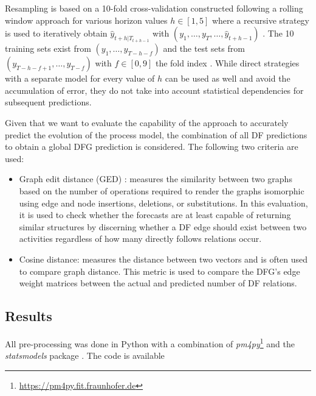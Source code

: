 Resampling is based on a 10-fold cross-validation constructed following a rolling window approach for various horizon values $h\in[1,5]$ where a recursive strategy is used to iteratively obtain $\hat{y}_{t+h|T_{t+h-1}}$ with $(y_1,\dots,y_{T},\dots,\hat{y}_{t+h-1})$ \cite{weigend2018time}.
The 10 training sets exist from $(y_1,\dots,y_{T-h-f})$ and the test sets from\\ $(y_{T-h-f+1},\dots,y_{T-f})$ with $f\in[0,9]$ the fold index \cite{bergmeir2012use}.
While direct strategies with a separate model for every value of $h$ can be used as well and avoid the accumulation of error, they do not take into account statistical dependencies for subsequent predictions.

Given that we want to evaluate the capability of the approach to accurately predict the evolution of the process model, the combination of all DF predictions to obtain a global DFG prediction is considered.
The following two criteria are used:
\begin{itemize}
	\item Graph edit distance (GED) \cite{gao2010survey}: measures the similarity between two graphs based on the number of operations required to render the graphs isomorphic using edge and node insertions, deletions, or substitutions.
	In this evaluation, it is used to check whether the forecasts are at least capable of returning similar structures by discerning whether a DF edge should exist between two activities regardless of how many directly follows relations occur.
	\item Cosine distance: measures the distance between two vectors and is often used to compare graph distance. This metric is used to compare the DFG's edge weight matrices between the actual and predicted number of DF relations.
\end{itemize}

\subsection{Results}
All pre-processing was done in Python with a combination of \emph{pm4py}\footnote{\url{https://pm4py.fit.fraunhofer.de}} and the \emph{statsmodels} package \cite{seabold2010statsmodels}. 
The code is available %

